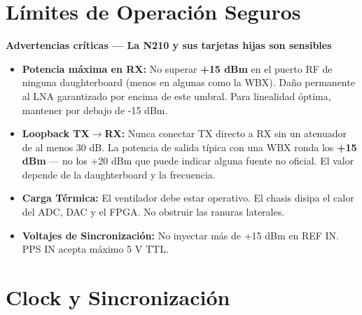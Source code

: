 \documentclass[11pt]{article}
\begin{document}
\section{Límites de Operación Seguros}

\begin{advertencia}
\textbf{Advertencias críticas — La N210 y sus tarjetas hijas son sensibles}
\end{advertencia}

\vspace{4pt}
\begin{itemize}
    \item \textbf{Potencia máxima en RX:} No superar \textbf{+15 dBm} en el puerto RF de ninguna daughterboard (menos en algunas como la WBX). Daño permanente al LNA garantizado por encima de este umbral. Para linealidad óptima, mantener por debajo de -15 dBm.
    \item \textbf{Loopback TX$\to$RX:} Nunca conectar TX directo a RX sin un atenuador de al menos 30 dB. La potencia de salida típica con una WBX ronda los \textbf{+15 dBm} — no los +20 dBm que puede indicar alguna fuente no oficial. El valor depende de la daughterboard y la frecuencia.
    \item \textbf{Carga Térmica:} El ventilador debe estar operativo. El chasis disipa el calor del ADC, DAC y el FPGA. No obstruir las ranuras laterales.
    \item \textbf{Voltajes de Sincronización:} No inyectar más de +15 dBm en REF IN. PPS IN acepta máximo 5 V TTL.
\end{itemize}

\section{Clock y Sincronización}
\end{document}
